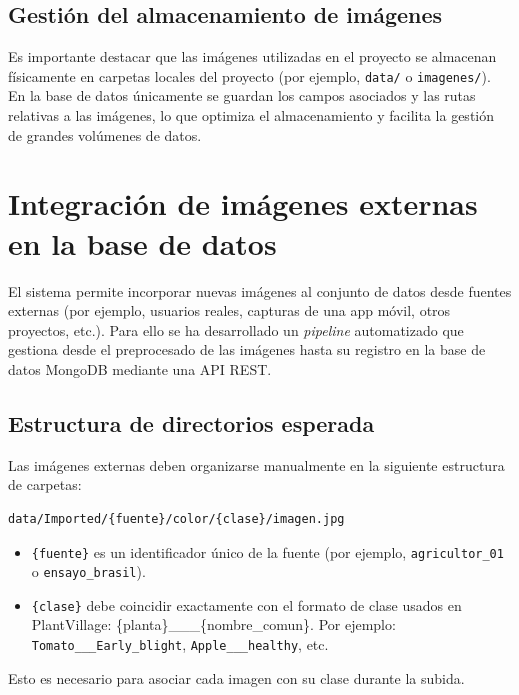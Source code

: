\documentclass[12pt,a4paper]{article}
\begin{document}
\subsection*{Gestión del almacenamiento de imágenes}

Es importante destacar que las imágenes utilizadas en el proyecto se almacenan físicamente en carpetas locales del proyecto (por ejemplo, \texttt{data/} o \texttt{imagenes/}). En la base de datos únicamente se guardan los campos asociados y las rutas relativas a las imágenes, lo que optimiza el almacenamiento y facilita la gestión de grandes volúmenes de datos.

\section{Integración de imágenes externas en la base de datos}

El sistema permite incorporar nuevas imágenes al conjunto de datos desde fuentes externas (por ejemplo, usuarios reales, capturas de una app móvil, otros proyectos, etc.). Para ello se ha desarrollado un \textit{pipeline} automatizado que gestiona desde el preprocesado de las imágenes hasta su registro en la base de datos MongoDB mediante una API REST.

\subsection{Estructura de directorios esperada}

Las imágenes externas deben organizarse manualmente en la siguiente estructura de carpetas:

\begin{verbatim}
data/Imported/{fuente}/color/{clase}/imagen.jpg
\end{verbatim}

\begin{itemize}
    \item \texttt{\{fuente\}} es un identificador único de la fuente (por ejemplo, \texttt{agricultor\_01} o \texttt{ensayo\_brasil}).
    \item \texttt{\{clase\}} debe coincidir exactamente con el formato de clase usados en PlantVillage: \{planta\}\_\_\_\{nombre\_comun\}. Por ejemplo: \texttt{Tomato\_\_\_Early\_blight}, \texttt{Apple\_\_\_healthy}, etc. 
\end{itemize}

Esto es necesario para asociar cada imagen con su clase durante la subida.
\end{document}
